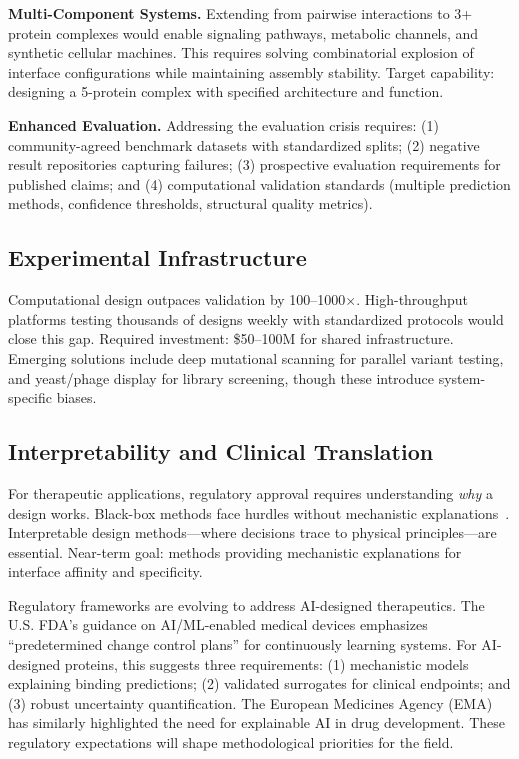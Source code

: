 \textbf{Multi-Component Systems.} Extending from pairwise interactions to 3+ protein complexes would enable signaling pathways, metabolic channels, and synthetic cellular machines. This requires solving combinatorial explosion of interface configurations while maintaining assembly stability. Target capability: designing a 5-protein complex with specified architecture and function.

\textbf{Enhanced Evaluation.} Addressing the evaluation crisis requires: (1) community-agreed benchmark datasets with standardized splits; (2) negative result repositories capturing failures; (3) prospective evaluation requirements for published claims; and (4) computational validation standards (multiple prediction methods, confidence thresholds, structural quality metrics).

\subsection{Experimental Infrastructure}

Computational design outpaces validation by 100--1000$\times$. High-throughput platforms testing thousands of designs weekly with standardized protocols would close this gap. Required investment: \$50--100M for shared infrastructure. Emerging solutions include deep mutational scanning for parallel variant testing, and yeast/phage display for library screening, though these introduce system-specific biases.

\subsection{Interpretability and Clinical Translation}

For therapeutic applications, regulatory approval requires understanding \textit{why} a design works. Black-box methods face hurdles without mechanistic explanations~\cite{raybould2019developability}. Interpretable design methods---where decisions trace to physical principles---are essential. Near-term goal: methods providing mechanistic explanations for interface affinity and specificity.

Regulatory frameworks are evolving to address AI-designed therapeutics. The U.S. FDA's guidance on AI/ML-enabled medical devices emphasizes ``predetermined change control plans'' for continuously learning systems. For AI-designed proteins, this suggests three requirements: (1) mechanistic models explaining binding predictions; (2) validated surrogates for clinical endpoints; and (3) robust uncertainty quantification. The European Medicines Agency (EMA) has similarly highlighted the need for explainable AI in drug development. These regulatory expectations will shape methodological priorities for the field.

